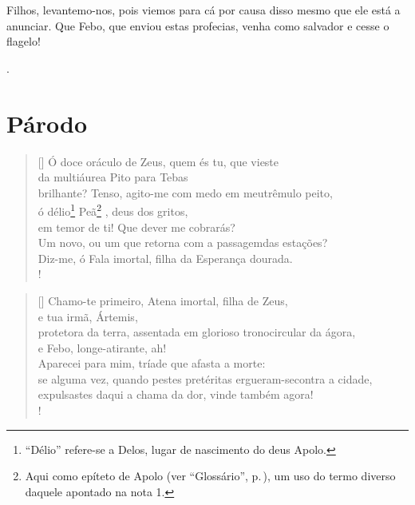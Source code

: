    Filhos, levantemo-nos, pois viemos para cá por causa disso mesmo que ele
 está a anunciar. Que Febo, que enviou estas profecias, venha como
salvador e cesse o flagelo!
\bigskip

.


\pagebreak

\section{Párodo}





\settowidth{\versewidth}{brilhante? Tenso, agito-me com medo em meu trêmulo}
\begin{verse}[\versewidth]
Ó doce oráculo de Zeus, quem és tu, que vieste\\
da multiáurea Pito para Tebas\\
brilhante? Tenso, agito-me com medo em meu\qb trêmulo peito,\\
ó délio\footnote{``Délio'' refere-se a Delos, lugar de nascimento do
        deus Apolo.} Peã\footnote{Aqui como epíteto de Apolo (ver ``Glossário'', p.\,\pageref{glossario}),
								  um uso do termo diverso daquele apontado na nota 1.}%
					    , deus dos gritos,\\
em temor de ti! Que dever me cobrarás?\\
Um novo, ou um que retorna com a passagem\qb das estações?\\
Diz-me, ó Fala imortal, filha da Esperança dourada.\\!
\end{verse}


\settowidth{\versewidth}{%
brilhante? Tenso, agito-me com medo em meu trêmulo}
\begin{verse}[\versewidth]
Chamo-te primeiro, Atena imortal, filha de Zeus,\\
e tua irmã, Ártemis,\\
protetora da terra, assentada em glorioso trono\qb circular da ágora,\\
e Febo, longe-atirante, ah!\\
Aparecei para mim, tríade que afasta a morte:\\
se alguma vez, quando pestes pretéritas ergueram-se\qb contra a cidade,\\
expulsastes daqui a chama da dor, vinde também agora!\\!
\end{verse} 

